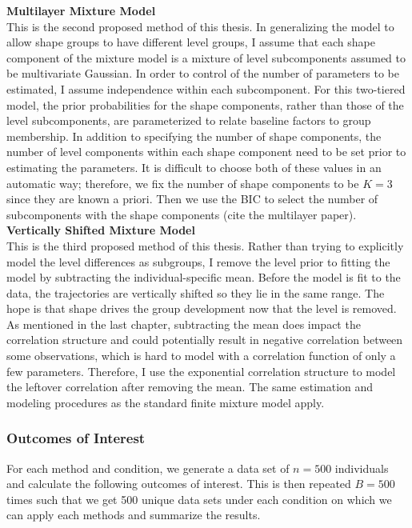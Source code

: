 \documentclass[12pt]{article}
\begin{document}
\textbf{Multilayer Mixture Model}\\
This is the second proposed method of this thesis. In generalizing the model to allow shape groups to have different level groups, I assume that each shape component of the mixture model is a mixture of level subcomponents assumed to be multivariate Gaussian. In order to control of the number of parameters to be estimated, I assume independence within each subcomponent. For this two-tiered model, the prior probabilities for the shape components, rather than those of the level subcomponents, are parameterized to relate baseline factors to group membership. In addition to specifying the number of shape components, the number of level components within each shape component need to be set prior to estimating the parameters. It is difficult to choose both of these values in an automatic way; therefore, we fix the number of shape components to be $K=3$ since they are known a priori. Then we use the BIC to select the number of subcomponents with the shape components (cite the multilayer paper). \\

\textbf{Vertically Shifted Mixture Model}\\
This is the third proposed method of this thesis. Rather than trying to explicitly model the level differences as subgroups, I remove the level prior to fitting the model by subtracting the individual-specific mean. Before the model is fit to the data, the trajectories are vertically shifted so they lie in the same range. The hope is that shape drives the group development now that the level is removed. As mentioned in the last chapter, subtracting the mean does impact the correlation structure and could potentially result in negative correlation between some observations, which is hard to model with a correlation function of only a few parameters. Therefore, I use the exponential correlation structure to model the leftover correlation after removing the mean. The same estimation and modeling procedures as the standard finite mixture model apply.
\subsubsection{Outcomes of Interest}
For each method and condition, we generate a data set of $n=500$ individuals and calculate the following outcomes of interest. This is then repeated $B=500$ times such that we get 500 unique data sets under each condition on which we can apply each methods and summarize the results.\\
\end{document}
